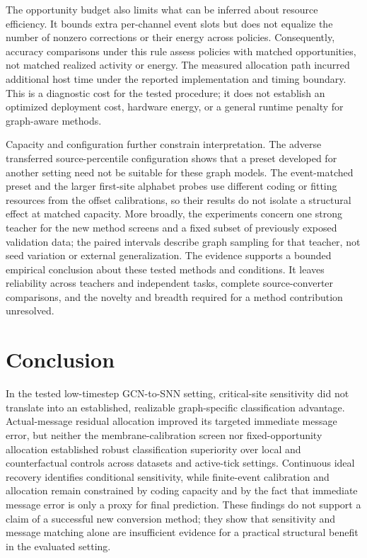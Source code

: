 \documentclass[11pt]{article}
\begin{document}
The opportunity budget also limits what can be inferred about resource efficiency. It bounds extra per-channel event slots but does not equalize the number of nonzero corrections or their energy across policies. Consequently, accuracy comparisons under this rule assess policies with matched opportunities, not matched realized activity or energy. The measured allocation path incurred additional host time under the reported implementation and timing boundary. This is a diagnostic cost for the tested procedure; it does not establish an optimized deployment cost, hardware energy, or a general runtime penalty for graph-aware methods.

Capacity and configuration further constrain interpretation. The adverse transferred source-percentile configuration shows that a preset developed for another setting need not be suitable for these graph models. The event-matched preset and the larger first-site alphabet probes use different coding or fitting resources from the offset calibrations, so their results do not isolate a structural effect at matched capacity. More broadly, the experiments concern one strong teacher for the new method screens and a fixed subset of previously exposed validation data; the paired intervals describe graph sampling for that teacher, not seed variation or external generalization. The evidence supports a bounded empirical conclusion about these tested methods and conditions. It leaves reliability across teachers and independent tasks, complete source-converter comparisons, and the novelty and breadth required for a method contribution unresolved.

\section{Conclusion}

In the tested low-timestep GCN-to-SNN setting, critical-site sensitivity did not translate into an established, realizable graph-specific classification advantage. Actual-message residual allocation improved its targeted immediate message error, but neither the membrane-calibration screen nor fixed-opportunity allocation established robust classification superiority over local and counterfactual controls across datasets and active-tick settings. Continuous ideal recovery identifies conditional sensitivity, while finite-event calibration and allocation remain constrained by coding capacity and by the fact that immediate message error is only a proxy for final prediction. These findings do not support a claim of a successful new conversion method; they show that sensitivity and message matching alone are insufficient evidence for a practical structural benefit in the evaluated setting.



\end{document}
